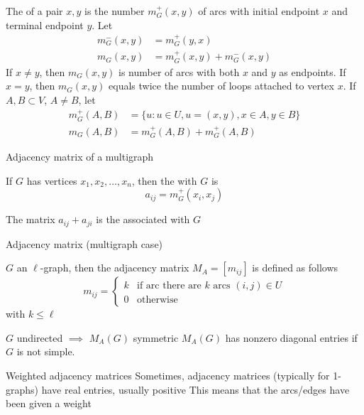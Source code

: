 \documentclass[aspectratio=169]{beamer}\usepackage[]{graphicx}\usepackage[]{xcolor}
\begin{document}
\begin{frame}
	\begin{definition}
		The  of a pair $x,y$ is the number $m_G^+(x,y)$ of arcs with initial endpoint $x$ and terminal endpoint $y$. Let
		\begin{align*}
			m_G^-(x,y) &= m_G^+(y,x) \\
			m_G(x,y) &= m_G^+(x,y)+m_G^-(x,y)
		\end{align*}
		If $x\neq y$, then $m_G(x,y)$ is number of arcs with both $x$ and $y$ as endpoints. If $x=y$, then $m_G(x,y)$ equals twice the number of loops attached to vertex $x$. If $A,B\subset V$, $A\neq B$, let
		\begin{align*}
			m_G^+(A,B) &= \{u:u\in U, u=(x,y),x\in A,y\in B\} \\
			m_G(A,B) &= m_G^+(A,B)+m_G^+(A,B)
		\end{align*}
	\end{definition}
\end{frame}

\begin{frame}{Adjacency matrix of a multigraph}
\begin{definition}
	If $G$ has vertices $x_1,x_2,\ldots,x_n$, then the  with $G$ is 
	\[
	a_{ij}=m_G^+(x_i,x_j)
	\]
\end{definition}
\vfill
\begin{definition}
	The matrix $a_{ij}+a_{ji}$ is the  associated with $G$
\end{definition}
\end{frame}

\begin{frame}{Adjacency matrix (multigraph case)}
	\begin{definition}
		$G$ an $\ell$-graph, then the adjacency matrix $M_A=[m_{ij}]$ is defined as follows
		\[
		m_{ij} = \begin{cases}
			k & \text{if arc there are $k$ arcs } (i,j)\in U\\
			0 & \text{otherwise}
		\end{cases}
		\]
		with $k\leq \ell$
	\end{definition}
	\vfill
	$G$ undirected $\implies$ $M_A(G)$ symmetric
	\vfill
	$M_A(G)$ has nonzero diagonal entries if $G$ is not simple.
\end{frame}

\begin{frame}{Weighted adjacency matrices}
	Sometimes, adjacency matrices (typically for 1-graphs) have real entries, usually positive
	\vfill
	This means that the arcs/edges have been given a weight
\end{frame}
\end{document}
